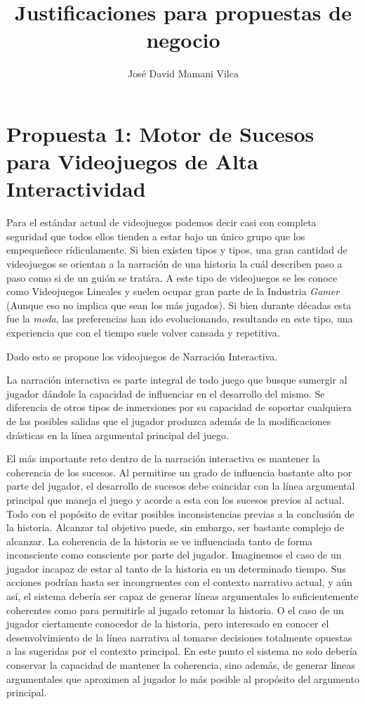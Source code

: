\documentclass[12pt,conference]{IEEEtran}
\begin{document}
\title{Justificaciones para propuestas de negocio}

\author{José David Mamani Vilca}%

\onecolumn

\maketitle


\section{Propuesta 1: Motor de Sucesos para Videojuegos de Alta Interactividad}
Para el estándar actual de videojuegos podemos decir casi con completa seguridad que todos ellos tienden a estar bajo un único grupo que los empequeñece rídiculamente. Si bien existen tipos y tipos, una gran cantidad de videojuegos se orientan a la narración de una historia la cuál describen paso  a paso como si de un guión se tratára. A este tipo de videojuegos se les conoce como Videojuegos Lineales y suelen ocupar gran parte de la Industria \textit{Gamer} (Aunque eso no implica que sean los más  jugados). Si bien durante décadas esta fue la \textit{moda}, las preferencias han ido evolucionando, resultando en este tipo, una experiencia que con el tiempo suele volver cansada y repetitiva. 

Dado esto se propone los videojuegos de Narración Interactiva.

La narración interactiva es parte integral de todo juego que busque sumergir al jugador dándole la capacidad de influenciar en el desarrollo del mismo. Se diferencia de otros tipos de inmersiones por su capacidad de soportar cualquiera de las posibles salidas que el jugador produzca además de la modificaciones drásticas en la línea argumental principal del juego.

El más importante reto dentro de la narración interactiva es mantener la coherencia de los sucesos. Al permitirse un
grado de influencia bastante alto por parte del jugador, el desarrollo de sucesos debe coincidar con la línea argumental principal que maneja el juego y acorde a esta con los sucesos previos al actual. Todo con el popósito de evitar posibles inconsistencias previas a la conclusión de la historia. Alcanzar tal objetivo puede, sin embargo, ser bastante complejo de alcanzar. La coherencia de la historia se ve influenciada tanto de forma inconsciente como consciente por parte del jugador. Imaginemos el caso de un jugador incapaz de estar al tanto de la historia en un determinado tiempo. Sus acciones podrían hasta ser incongruentes con el contexto narrativo actual, y aún así, el sistema debería ser capaz de generar líneas argumentales lo suficientemente coherentes como para permitirle al jugado retomar la historia. O el caso de un jugador ciertamente conocedor de la historia, pero interesado en conocer el desenvolvimiento de la línea narrativa al tomarse decisiones totalmente opuestas a las sugeridas por el contexto principal. En este punto el sistema no solo debería conservar la capacidad de mantener la coherencia, sino además, de generar líneas argumentales que aproximen al jugador lo más posible al propósito del argumento principal.
\end{document}

